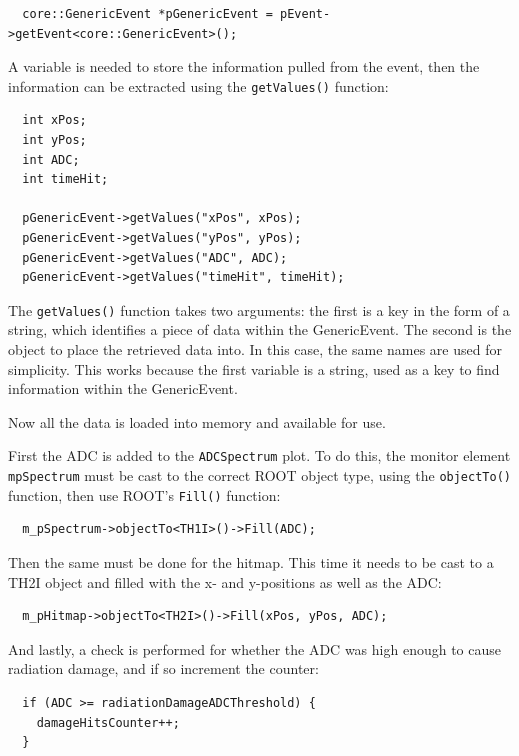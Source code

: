 \begin{lstlisting}
  core::GenericEvent *pGenericEvent = pEvent->getEvent<core::GenericEvent>();
\end{lstlisting}

A variable is needed to store the information pulled from the event, then the information can be extracted using the \texttt{getValues()} function:

\begin{lstlisting}
  int xPos;
  int yPos;
  int ADC;
  int timeHit;

  pGenericEvent->getValues("xPos", xPos);
  pGenericEvent->getValues("yPos", yPos);
  pGenericEvent->getValues("ADC", ADC);
  pGenericEvent->getValues("timeHit", timeHit);
\end{lstlisting}

The \texttt{getValues()} function takes two arguments: the first is a key in the form of a string, which identifies a piece of data within the GenericEvent. The second is the object to place the retrieved data into. In this case, the same names are used for simplicity. This works because the first variable is a string, used as a key to find information within the GenericEvent.

Now all the data is loaded into memory and available for use. 

First the ADC is added to the \texttt{ADC\textunderscore Spectrum} plot. To do this, the monitor element \texttt{m\textunderscore pSpectrum} must be cast to the correct ROOT object type, using the \texttt{objectTo()} function, then use ROOT's \texttt{Fill()} function:

\begin{lstlisting}
  m_pSpectrum->objectTo<TH1I>()->Fill(ADC);
\end{lstlisting}

Then the same must be done for the hitmap. This time it needs to be cast to a TH2I object and filled with the x- and y-positions as well as the \acrshort{ADC}:

\begin{lstlisting}
  m_pHitmap->objectTo<TH2I>()->Fill(xPos, yPos, ADC);
\end{lstlisting}

And lastly, a check is performed for whether the \acrshort{ADC} was high enough to cause radiation damage, and if so increment the counter:

\begin{lstlisting}
  if (ADC >= radiationDamageADCThreshold) {
    damageHitsCounter++;
  }
\end{lstlisting}

